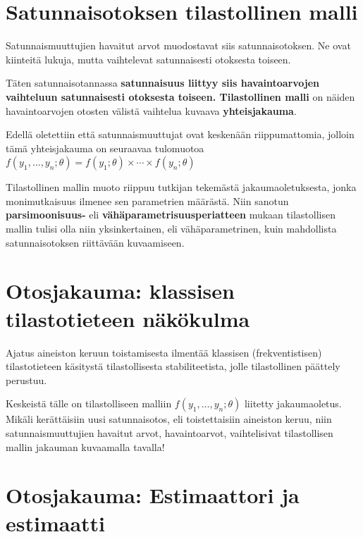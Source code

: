 \documentclass[
]{report}
\begin{document}
\hypertarget{satunnaisotoksen-tilastollinen-malli}{%
\section{Satunnaisotoksen tilastollinen
malli}\label{satunnaisotoksen-tilastollinen-malli}}

Satunnaismuuttujien havaitut arvot muodostavat siis satunnaisotoksen. Ne
ovat kiinteitä lukuja, mutta vaihtelevat satunnaisesti otoksesta
toiseen.

Täten satunnaisotannassa \textbf{satunnaisuus liittyy siis
havaintoarvojen vaihteluun satunnaisesti otoksesta toiseen.
Tilastollinen malli} on näiden havaintoarvojen otosten välistä vaihtelua
kuvaava \textbf{yhteisjakauma}.

Edellä oletettiin että satunnaismuuttujat ovat keskenään riippumattomia,
jolloin tämä yhteisjakauma on seuraavaa tulomuotoa
\(f(y_1,\dots,y_n;\theta) = f(y_1;\theta) \times \cdots \times f(y_n;\theta)\)

Tilastollinen mallin muoto riippuu tutkijan tekemästä
jakaumaoletuksesta, jonka monimutkaisuus ilmenee sen parametrien
määrästä. Niin sanotun \textbf{parsimoonisuus-} eli
\textbf{vähäparametrisuusperiatteen} mukaan tilastollisen mallin tulisi
olla niin yksinkertainen, eli vähäparametrinen, kuin mahdollista
satunnaisotoksen riittävään kuvaamiseen.

\hypertarget{otosjakauma-klassisen-tilastotieteen-nuxe4kuxf6kulma}{%
\section{Otosjakauma: klassisen tilastotieteen
näkökulma}\label{otosjakauma-klassisen-tilastotieteen-nuxe4kuxf6kulma}}

Ajatus aineiston keruun toistamisesta ilmentää klassisen
(frekventistisen) tilastotieteen käsitystä tilastollisesta
stabiliteetista, jolle tilastollinen päättely perustuu.

Keskeistä tälle on tilastolliseen malliin \(f(y_1,\dots,y_n;\theta)\)
liitetty jakaumaoletus. Mikäli kerättäisiin uusi satunnaisotos, eli
toistettaisiin aineiston keruu, niin satunnaismuuttujien havaitut arvot,
havaintoarvot, vaihtelisivat tilastollisen mallin jakauman kuvaamalla
tavalla!

\hypertarget{otosjakauma-estimaattori-ja-estimaatti}{%
\section{Otosjakauma: Estimaattori ja
estimaatti}\label{otosjakauma-estimaattori-ja-estimaatti}}
\end{document}
